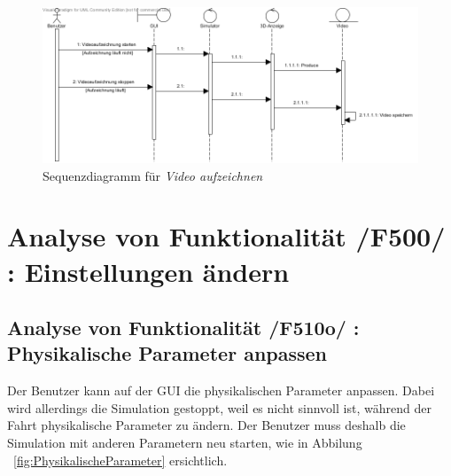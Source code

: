 \begin{figure}[!h]
\includegraphics[width=\linewidth]{bilder/Video_aufzeichnen}
\caption{Sequenzdiagramm für \textit{Video aufzeichnen}}
\label{fig:Video_aufzeichnen}
\end{figure}

\newpage
\section{Analyse von Funktionalität /F500/ :  Einstellungen ändern}
\subsection{Analyse von Funktionalität /F510o/ :  Physikalische Parameter anpassen}
Der Benutzer kann auf der GUI die physikalischen Parameter anpassen. Dabei wird allerdings die Simulation gestoppt, weil es nicht sinnvoll ist, während der Fahrt physikalische Parameter zu ändern. Der Benutzer muss deshalb die Simulation mit anderen Parametern neu starten, wie in Abbilung ~\ref{fig:PhysikalischeParameter} ersichtlich.


